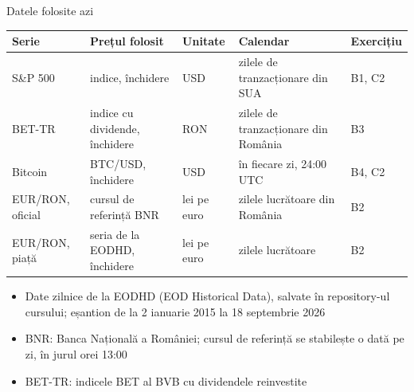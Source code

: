 \begin{frame}{Datele folosite azi}
\itemsize{\footnotesize}
\begin{center}
\footnotesize
\begin{tabular}{>{\raggedright\arraybackslash}p{2.2cm}>{\raggedright\arraybackslash}p{3.6cm}>{\raggedright\arraybackslash}p{1.6cm}>{\raggedright\arraybackslash}p{3.4cm}l}
\toprule
\textbf{Serie} & \textbf{Prețul folosit} & \textbf{Unitate} & \textbf{Calendar} & \textbf{Exercițiu} \\
\midrule
S\&P 500 & indice, închidere & USD & zilele de tranzacționare din SUA & B1, C2 \\
BET-TR & indice cu dividende, închidere & RON & zilele de tranzacționare din România & B3 \\
Bitcoin & BTC/USD, închidere & USD & în fiecare zi, 24:00 UTC & B4, C2 \\
EUR/RON, oficial & cursul de referință BNR & lei pe euro & zilele lucrătoare din România & B2 \\
EUR/RON, piață & seria de la EODHD, închidere & lei pe euro & zilele lucrătoare & B2 \\
\bottomrule
\end{tabular}
\end{center}
\begin{itemize}
    \item Date zilnice de la EODHD (EOD Historical Data), salvate în repository-ul cursului; eșantion de la 2 ianuarie 2015 la 18 septembrie 2026
    \item BNR: Banca Națională a României; cursul de referință se stabilește o dată pe zi, în jurul orei 13:00
    \item BET-TR: indicele BET al BVB cu dividendele reinvestite
\end{itemize}
\end{frame}

